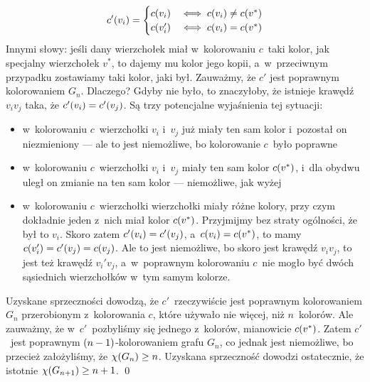 \begin{itemize}
                \begin{equation*}
                    c'\pars{v_i} = \begin{cases}
                        c\pars{v_i} & \iff c\pars{v_i} \neq c\pars{v^\ast}\\
                        c\pars{v_i'} & \iff c\pars{v_i} = c\pars{v^\ast}
                    \end{cases}
                \end{equation*}
                Innymi słowy: jeśli dany wierzchołek miał w~kolorowaniu $c$~taki kolor, jak specjalny wierzchołek $v^\ast$, to dajemy mu kolor jego kopii, a~w~przeciwnym przypadku zostawiamy taki kolor, jaki był. Zauważmy, że $c'$ jest poprawnym kolorowaniem $G_n$. Dlaczego? Gdyby nie było, to znaczyłoby, że istnieje krawędź $v_iv_j$ taka, że $c'\pars{v_i} = c'\pars{v_j}$. Są trzy potencjalne wyjaśnienia tej sytuacji:
                \begin{itemize}
                    \item w~kolorowaniu $c$~wierzchołki $v_i$ i~$v_j$ już miały ten sam kolor i~pozostał on niezmieniony --- ale to jest niemożliwe, bo kolorowanie $c$~było poprawne
                    \item w~kolorowaniu $c$~wierzchołki $v_i$ i~$v_j$ miały ten sam kolor $c\pars{v^\ast}$, i~dla obydwu uległ on zmianie na ten sam kolor --- niemożliwe, jak wyżej
                    \item w~kolorowaniu $c$~wierzchołki wierzchołki miały różne kolory, przy czym dokładnie jeden z~nich miał kolor $c\pars{v^\ast}$. Przyjmijmy bez straty ogólności, że był to $v_i$. Skoro zatem $c'\pars{v_i} = c'\pars{v_j}$, a~$c\pars{v_i} = c\pars{v^\ast}$, to mamy $c\pars{v_i'} = c'\pars{v_j} = c\pars{v_j}$. Ale to jest niemożliwe, bo skoro jest krawędź $v_iv_j$, to jest też krawędź $v_i'v_j$, a~w~poprawnym kolorowaniu $c$~nie mogło być dwóch sąsiednich wierzchołków w~tym samym kolorze.
                \end{itemize}
                Uzyskane sprzeczności dowodzą, że $c'$~rzeczywiście jest poprawnym kolorowaniem $G_n$ przerobionym z~kolorowania $c$, które używało nie więcej, niż $n$~kolorów. Ale zauważmy, że w~$c'$~pozbyliśmy się  jednego z~kolorów, mianowicie $c\pars{v^\ast}$. Zatem $c'$~jest poprawnym $\left(n - 1\right)$-kolorowaniem grafu $G_n$, co jednak jest niemożliwe, bo przecież założyliśmy, że $\chi\pars{G_n} \geq n$. Uzyskana sprzeczność dowodzi ostatecznie, że istotnie $\chi\pars{G_{n + 1}} \geq n + 1$.
                \qed
        \end{itemize}
